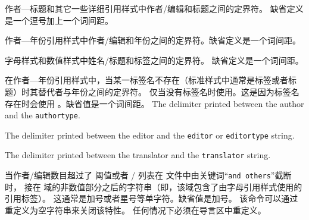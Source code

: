 \begin{ltxsyntax}
\CSdelimMark
作者---标题和其它一些详细引用样式中作者/编辑和标题之间的定界符。
缺省定义是一个逗号加上一个词间距。

\CSdelimMark
作者---年份引用样式中作者/编辑和年份之间的定界符。缺省定义是一个词间距。

\CSdelimMark
字母样式和数值样式中姓名\slash 标题和标签之间的定界符。
缺省定义是一个词间距。

\CSdelimMark
在作者---年份引用样式中，当某一标签名不存在（标准样式中通常是标签或者标题）时其替代者与年份之间的定界符。
仅当没有标签名时使用。这是因为标签名存在时会使用 。缺省值是一个词间距。
\CSdelimMark
The delimiter printed between the author and the \texttt{authortype}.

\CSdelimMark
The delimiter printed between the editor and the \texttt{editor} or \texttt{editortype} string.

\CSdelimMark
The delimiter printed between the translator and the \texttt{translator} string.

当作者/编辑数目超过了  阈值或者 \slash {} 列表在  文件中由关键词“\texttt{and others}”截断时，
接在  域的非数值部分之后的字符串（即，该域包含了由字母引用样式使用的引用标签）。
这通常是加号或者星号等单字符。缺省值是加号。
该命令可以通过重定义为空字符串来关闭该特性。
任何情况下必须在导言区中重定义。


\end{ltxsyntax}

